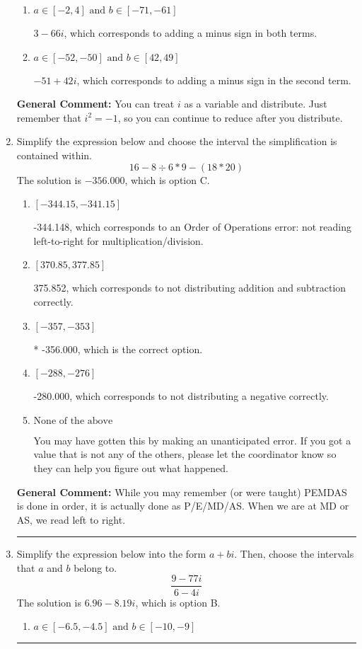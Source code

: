 \documentclass{extbook}[14pt]
\newcommand{\litem}[1]{\item #1

\rule{\textwidth}{0.4pt}}
\begin{document}
\begin{enumerate}
{\begin{enumerate}[label=\Alph*.]
 $-51 - 42 i$, which corresponds to adding a minus sign in the first term.
\item \( a \in [-2, 4] \text{ and } b \in [-71, -61] \)

 $3 - 66 i$, which corresponds to adding a minus sign in both terms.
\item \( a \in [-52, -50] \text{ and } b \in [42, 49] \)

 $-51 + 42 i$, which corresponds to adding a minus sign in the second term.
\end{enumerate}

\textbf{General Comment:} You can treat $i$ as a variable and distribute. Just remember that $i^2=-1$, so you can continue to reduce after you distribute.
}
\litem{
Simplify the expression below and choose the interval the simplification is contained within.
\[ 16 - 8 \div 6 * 9 - (18 * 20) \]The solution is \( -356.000 \), which is option C.\begin{enumerate}[label=\Alph*.]
\item \( [-344.15, -341.15] \)

 -344.148, which corresponds to an Order of Operations error: not reading left-to-right for multiplication/division.
\item \( [370.85, 377.85] \)

 375.852, which corresponds to not distributing addition and subtraction correctly.
\item \( [-357, -353] \)

* -356.000, which is the correct option.
\item \( [-288, -276] \)

 -280.000, which corresponds to not distributing a negative correctly.
\item \( \text{None of the above} \)

 You may have gotten this by making an unanticipated error. If you got a value that is not any of the others, please let the coordinator know so they can help you figure out what happened.
\end{enumerate}

\textbf{General Comment:} While you may remember (or were taught) PEMDAS is done in order, it is actually done as P/E/MD/AS. When we are at MD or AS, we read left to right.
}
\litem{
Simplify the expression below into the form $a+bi$. Then, choose the intervals that $a$ and $b$ belong to.
\[ \frac{9 - 77 i}{6 - 4 i} \]The solution is \( 6.96  - 8.19 i \), which is option B.\begin{enumerate}[label=\Alph*.]
\item \( a \in [-6.5, -4.5] \text{ and } b \in [-10, -9] \)


\end{enumerate}}
\end{enumerate}
\end{document}
